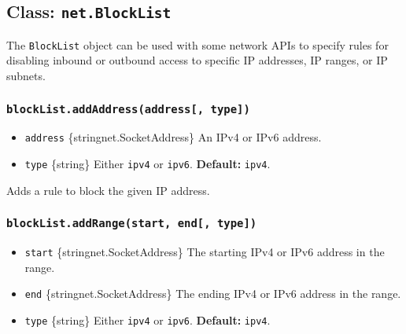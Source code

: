 \subsection{\texorpdfstring{Class:
\texttt{net.BlockList}}{Class: net.BlockList}}\label{class-net.blocklist}

The \texttt{BlockList} object can be used with some network APIs to
specify rules for disabling inbound or outbound access to specific IP
addresses, IP ranges, or IP subnets.

\subsubsection{\texorpdfstring{\texttt{blockList.addAddress(address{[},\ type{]})}}{blockList.addAddress(address{[}, type{]})}}\label{blocklist.addaddressaddress-type}

\begin{itemize}
\tightlist
\item
  \texttt{address} \{string\textbar net.SocketAddress\} An IPv4 or IPv6
  address.
\item
  \texttt{type} \{string\} Either
  \texttt{\textquotesingle{}ipv4\textquotesingle{}} or
  \texttt{\textquotesingle{}ipv6\textquotesingle{}}. \textbf{Default:}
  \texttt{\textquotesingle{}ipv4\textquotesingle{}}.
\end{itemize}

Adds a rule to block the given IP address.

\subsubsection{\texorpdfstring{\texttt{blockList.addRange(start,\ end{[},\ type{]})}}{blockList.addRange(start, end{[}, type{]})}}\label{blocklist.addrangestart-end-type}

\begin{itemize}
\tightlist
\item
  \texttt{start} \{string\textbar net.SocketAddress\} The starting IPv4
  or IPv6 address in the range.
\item
  \texttt{end} \{string\textbar net.SocketAddress\} The ending IPv4 or
  IPv6 address in the range.
\item
  \texttt{type} \{string\} Either
  \texttt{\textquotesingle{}ipv4\textquotesingle{}} or
  \texttt{\textquotesingle{}ipv6\textquotesingle{}}. \textbf{Default:}
  \texttt{\textquotesingle{}ipv4\textquotesingle{}}.
\end{itemize}


